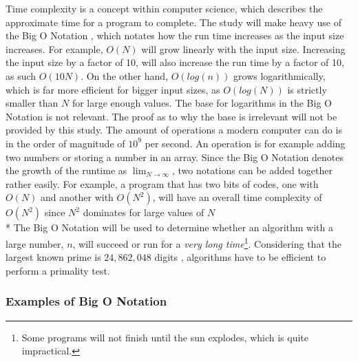 \documentclass[main.tex]{subfiles}
\begin{document}
Time complexity \cite{theorem:time_comp} is a concept within computer science,
which describes the approximate time for a program to complete. The study will
make heavy use of the Big O Notation \cite{theorem:big_O}, which notates how the
run time increases as the input size increases. For example, $O(N)$ will grow
linearly with the input size. Increasing the input size by a factor of 10, will
also increase the run time by a factor of 10, as such $O(10N)$. On the other
hand, $O(log(n))$ grows logarithmically, which is far more efficient for bigger
input sizes, as $O(log(N))$ is strictly smaller than $N$ for large enough
values. The base for logarithms in the Big O Notation is not relevant. The proof
as to why the base is irrelevant will not be provided by this study. \newline
The amount of operations a modern computer can do is in the order of magnitude
of $10^{9}$ per second. An operation is for example adding two numbers or
storing a number in an array. \newline Since the Big O Notation denotes the
growth of the runtime as $\lim_{N\to\infty}$, two notations can be added
together rather easily. For example, a program that has two bits of codes, one
with $O(N)$ and another with $O(N^{2})$, will have an overall time complexity of
$O(N^{2})$ since $N^{2}$ dominates for large values of $N$ \newline
\\*
The Big O Notation will be used to determine whether an algorithm with a large
number, $n$, will succeed or run for a \textit{very long time}\footnote{Some
  programs will not finish until the sun explodes, which is quite impractical.}.
Considering that the largest known prime is $24,862,048$ digits
\cite{prime:largest_digits}, algorithms have to be efficient to perform a
primality test.

\subsubsection{Examples of Big O Notation}
\end{document}
